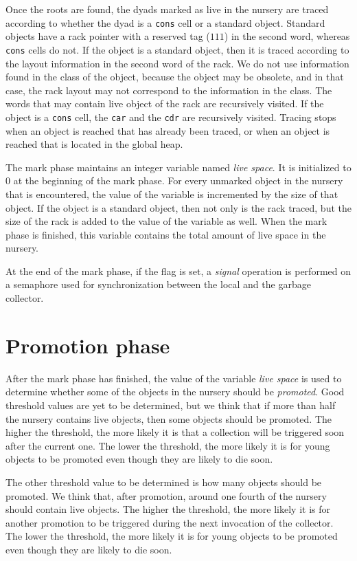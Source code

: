 Once the roots are found, the dyads marked as live in the nursery are
traced according to whether the dyad is a \texttt{cons} cell or a
standard object.  Standard objects have a rack pointer with a reserved
tag ($111$) in the second word, whereas \texttt{cons} cells do not.
If the object is a standard object, then it is traced according to the
layout information in the second word of the rack.  We do not use
information found in the class of the object, because the object may
be obsolete, and in that case, the rack layout may not correspond to
the information in the class.  The words that may contain live object
of the rack are recursively visited.  If the object is a \texttt{cons}
cell, the \texttt{car} and the \texttt{cdr} are recursively visited.
Tracing stops when an object is reached that has already been traced,
or when an object is reached that is located in the global heap.

The mark phase maintains an integer variable named \emph{live space}.
It is initialized to $0$ at the beginning of the mark phase.  For
every unmarked object in the nursery that is encountered, the value of
the variable is incremented by the size of that object.  If the object
is a standard object, then not only is the rack traced, but the size
of the rack is added to the value of the variable as well.  When the
mark phase is finished, this variable contains the total amount of
live space in the nursery.

At the end of the mark phase, if the flag is set, a \emph{signal}
operation is performed on a semaphore used for synchronization between
the local and the garbage collector.

\section{Promotion phase}

After the mark phase has finished, the value of the variable
\emph{live space} is used to determine whether some of the
objects in the nursery should be \emph{promoted}.  Good threshold
values are yet to be determined, but we think that if more than half
the nursery contains live objects, then some objects should be
promoted.  The higher the threshold, the more likely it is that a
collection will be triggered soon after the current one.  The lower
the threshold, the more likely it is for young objects to be promoted
even though they are likely to die soon.

The other threshold value to be determined is how many objects should
be promoted.  We think that, after promotion, around one fourth of the
nursery should contain live objects.  The higher the threshold, the
more likely it is for another promotion to be triggered during the
next invocation of the collector.  The lower the threshold, the more
likely it is for young objects to be promoted even though they are
likely to die soon.


